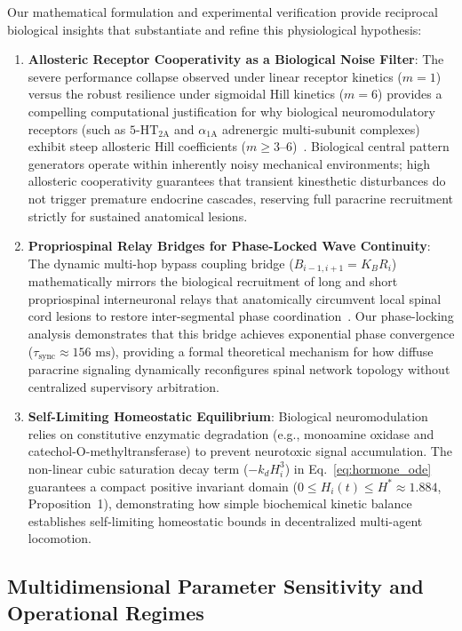 \documentclass{iopjournal}
\begin{document}
Our mathematical formulation and experimental verification provide reciprocal biological insights that substantiate and refine this physiological hypothesis:
\begin{enumerate}
  \item \textbf{Allosteric Receptor Cooperativity as a Biological Noise Filter}: The severe performance collapse observed under linear receptor kinetics ($m=1$) versus the robust resilience under sigmoidal Hill kinetics ($m=6$) provides a compelling computational justification for why biological neuromodulatory receptors (such as $5\text{-HT}_{2\text{A}}$ and $\alpha_{1\text{A}}$ adrenergic multi-subunit complexes) exhibit steep allosteric Hill coefficients ($m \ge 3\text{--}6$)~\cite{marder2006}. Biological central pattern generators operate within inherently noisy mechanical environments; high allosteric cooperativity guarantees that transient kinesthetic disturbances do not trigger premature endocrine cascades, reserving full paracrine recruitment strictly for sustained anatomical lesions.
  \item \textbf{Propriospinal Relay Bridges for Phase-Locked Wave Continuity}: The dynamic multi-hop bypass coupling bridge ($B_{i-1, i+1} = K_B R_i$) mathematically mirrors the biological recruitment of long and short propriospinal interneuronal relays that anatomically circumvent local spinal cord lesions to restore inter-segmental phase coordination~\cite{courtine2008}. Our phase-locking analysis demonstrates that this bridge achieves exponential phase convergence ($\tau_{\text{sync}} \approx 156\text{ ms}$), providing a formal theoretical mechanism for how diffuse paracrine signaling dynamically reconfigures spinal network topology without centralized supervisory arbitration.
  \item \textbf{Self-Limiting Homeostatic Equilibrium}: Biological neuromodulation relies on constitutive enzymatic degradation (e.g., monoamine oxidase and catechol-O-methyltransferase) to prevent neurotoxic signal accumulation. The non-linear cubic saturation decay term ($-k_d H_i^3$) in Eq.~\ref{eq:hormone_ode} guarantees a compact positive invariant domain ($0 \le H_i(t) \le H^* \approx 1.884$, Proposition~1), demonstrating how simple biochemical kinetic balance establishes self-limiting homeostatic bounds in decentralized multi-agent locomotion.
\end{enumerate}

\subsection{Multidimensional Parameter Sensitivity and Operational Regimes}
\end{document}
